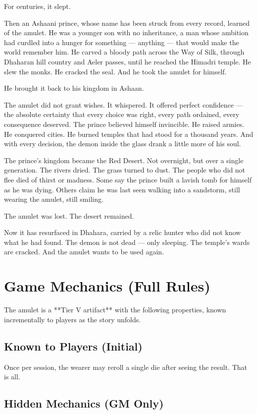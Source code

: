 \documentclass[11pt]{book}
\begin{document}
For centuries, it slept.

Then an Ashaani prince, whose name has been struck from every record, learned of the amulet. He was a younger son with no inheritance, a man whose ambition had curdled into a hunger for something — anything — that would make the world remember him. He carved a bloody path across the Way of Silk, through Dhaharan hill country and Aeler passes, until he reached the Himadri temple. He slew the monks. He cracked the seal. And he took the amulet for himself.

He brought it back to his kingdom in Ashaan.

The amulet did not grant wishes. It whispered. It offered perfect confidence — the absolute certainty that every choice was right, every path ordained, every consequence deserved. The prince believed himself invincible. He raised armies. He conquered cities. He burned temples that had stood for a thousand years. And with every decision, the demon inside the glass drank a little more of his soul.

The prince's kingdom became the Red Desert. Not overnight, but over a single generation. The rivers dried. The grass turned to dust. The people who did not flee died of thirst or madness. Some say the prince built a lavish tomb for himself as he was dying. Others claim he was last seen walking into a sandstorm, still wearing the amulet, still smiling.

The amulet was lost. The desert remained.

Now it has resurfaced in Dhahara, carried by a relic hunter who did not know what he had found. The demon is not dead — only sleeping. The temple’s wards are cracked. And the amulet wants to be used again.

\section{Game Mechanics (Full Rules)}

The amulet is a **Tier V artifact** with the following properties, known incrementally to players as the story unfolds.

\subsection*{Known to Players (Initial)}
Once per session, the wearer may reroll a single die after seeing the result. That is all.

\subsection*{Hidden Mechanics (GM Only)}
\end{document}
